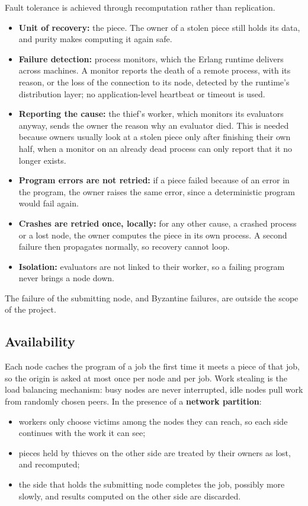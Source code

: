 \documentclass{scrartcl}
\begin{document}
Fault tolerance is achieved through recomputation rather than replication.
%
\begin{itemize}
  \item \textbf{Unit of recovery:} the piece. The owner of a stolen piece still holds its data, and purity makes computing it again safe.
  \item \textbf{Failure detection:} process monitors, which the Erlang runtime delivers across machines. A monitor reports the death of a remote process, with its reason, or the loss of the connection to its node, detected by the runtime's distribution layer; no application-level heartbeat or timeout is used.
  \item \textbf{Reporting the cause:} the thief's worker, which monitors its evaluators anyway, sends the owner the reason why an evaluator died. This is needed because owners usually look at a stolen piece only after finishing their own half, when a monitor on an already dead process can only report that it no longer exists.
  \item \textbf{Program errors are not retried:} if a piece failed because of an error in the program, the owner raises the same error, since a deterministic program would fail again.
  \item \textbf{Crashes are retried once, locally:} for any other cause, a crashed process or a lost node, the owner computes the piece in its own process. A second failure then propagates normally, so recovery cannot loop.
  \item \textbf{Isolation:} evaluators are not linked to their worker, so a failing program never brings a node down.
\end{itemize}

The failure of the submitting node, and Byzantine failures, are outside the scope of the project.

\subsection{Availability}\label{availability}

Each node caches the program of a job the first time it meets a piece of that job, so the origin is asked at most once per node and per job.
%
Work stealing is the load balancing mechanism: busy nodes are never interrupted, idle nodes pull work from randomly chosen peers.
%
In the presence of a \textbf{network partition}:
%
\begin{itemize}
  \item workers only choose victims among the nodes they can reach, so each side continues with the work it can see;
  \item pieces held by thieves on the other side are treated by their owners as lost, and recomputed;
  \item the side that holds the submitting node completes the job, possibly more slowly, and results computed on the other side are discarded.
\end{itemize}
\end{document}

